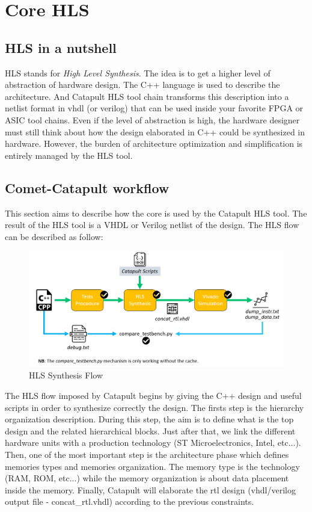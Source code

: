 \documentclass[10pt,letterpaper]{article}
\begin{document}
\newpage

\section{Core HLS}

\subsection{HLS in a nutshell}

HLS stands for \textit{High Level Synthesis}. The idea is to get a higher level of abstraction of hardware design. The C++ language is used to describe the architecture. And Catapult HLS tool chain transforms this description into a netlist format in vhdl (or verilog) that can be used inside your favorite FPGA or ASIC tool chains. Even if the level of abstraction is high, the hardware designer must still think about how the design elaborated in C++ could be synthesized in hardware. However, the burden of architecture optimization and simplification is entirely managed by the HLS tool.

\subsection{Comet-Catapult workflow}

This section aims to describe how the core is used by the Catapult HLS tool. The result of the HLS tool is a VHDL or Verilog netlist of the design. The HLS flow can be described as follow:

\begin{figure}[H]
\centering
\includegraphics[width=14cm]{img/hls_flow.PNG}
\caption{HLS Synthesis Flow}
\label{fig:HLS_synth}
\end{figure}

The HLS flow imposed by Catapult begins by giving the C++ design and useful scripts in order to synthesize correctly the design. The firsts step is the hierarchy organization description. During this step, the aim is to define what is the top design and the related hierarchical blocks. Just after that, we link the different hardware units with a production technology (ST Microelectronics, Intel, etc...). Then, one of the most important step is the architecture phase which defines memories types and memories organization. The memory type is the technology (RAM, ROM, etc...) while the memory organization is about data placement inside the memory. Finally, Catapult will elaborate the rtl design (vhdl/verilog output file - concat\_rtl.vhdl) according to the previous constraints.
\end{document}
